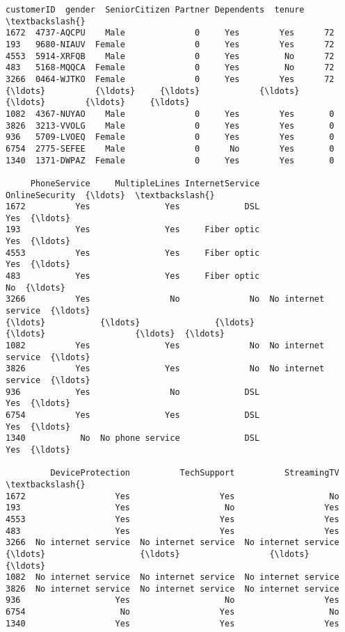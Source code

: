 \documentclass[11pt]{article}
\makeatletter
\newcommand{\boxspacing}{\kern\kvtcb@left@rule\kern\kvtcb@boxsep}
\newcommand{\prompt}[4]{
        {\ttfamily\llap{{\color{#2}[#3]:\hspace{3pt}#4}}\vspace{-\baselineskip}}
    }
\makeatother
\begin{document}
            \begin{tcolorbox}[breakable, size=fbox, boxrule=.5pt, pad at break*=1mm, opacityfill=0]
\prompt{Out}{outcolor}{9}{\boxspacing}
\begin{Verbatim}[commandchars=\\\{\}]
      customerID  gender  SeniorCitizen Partner Dependents  tenure  \textbackslash{}
1672  4737-AQCPU    Male              0     Yes        Yes      72
193   9680-NIAUV  Female              0     Yes        Yes      72
4553  5914-XRFQB    Male              0     Yes         No      72
483   5168-MQQCA  Female              0     Yes         No      72
3266  0464-WJTKO  Female              0     Yes        Yes      72
{\ldots}          {\ldots}     {\ldots}            {\ldots}     {\ldots}        {\ldots}     {\ldots}
1082  4367-NUYAO    Male              0     Yes        Yes       0
3826  3213-VVOLG    Male              0     Yes        Yes       0
936   5709-LVOEQ  Female              0     Yes        Yes       0
6754  2775-SEFEE    Male              0      No        Yes       0
1340  1371-DWPAZ  Female              0     Yes        Yes       0

     PhoneService     MultipleLines InternetService       OnlineSecurity  {\ldots}  \textbackslash{}
1672          Yes               Yes             DSL                  Yes  {\ldots}
193           Yes               Yes     Fiber optic                  Yes  {\ldots}
4553          Yes               Yes     Fiber optic                  Yes  {\ldots}
483           Yes               Yes     Fiber optic                   No  {\ldots}
3266          Yes                No              No  No internet service  {\ldots}
{\ldots}           {\ldots}               {\ldots}             {\ldots}                  {\ldots}  {\ldots}
1082          Yes               Yes              No  No internet service  {\ldots}
3826          Yes               Yes              No  No internet service  {\ldots}
936           Yes                No             DSL                  Yes  {\ldots}
6754          Yes               Yes             DSL                  Yes  {\ldots}
1340           No  No phone service             DSL                  Yes  {\ldots}

         DeviceProtection          TechSupport          StreamingTV  \textbackslash{}
1672                  Yes                  Yes                   No
193                   Yes                   No                  Yes
4553                  Yes                  Yes                  Yes
483                   Yes                  Yes                  Yes
3266  No internet service  No internet service  No internet service
{\ldots}                   {\ldots}                  {\ldots}                  {\ldots}
1082  No internet service  No internet service  No internet service
3826  No internet service  No internet service  No internet service
936                   Yes                   No                  Yes
6754                   No                  Yes                   No
1340                  Yes                  Yes                  Yes


\end{Verbatim}
\end{tcolorbox}
\end{document}
